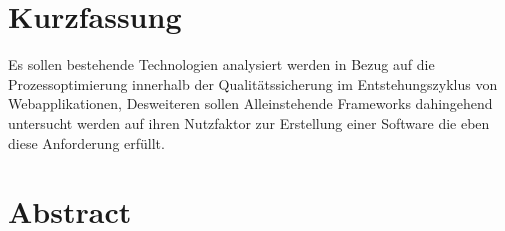\section*{Kurzfassung}
Es sollen bestehende Technologien analysiert werden in Bezug auf die Prozessoptimierung innerhalb der Qualitätssicherung im Entstehungszyklus von Webapplikationen, Desweiteren sollen Alleinstehende Frameworks dahingehend untersucht werden auf ihren Nutzfaktor zur Erstellung einer Software die eben diese Anforderung erfüllt.

\section*{Abstract}
